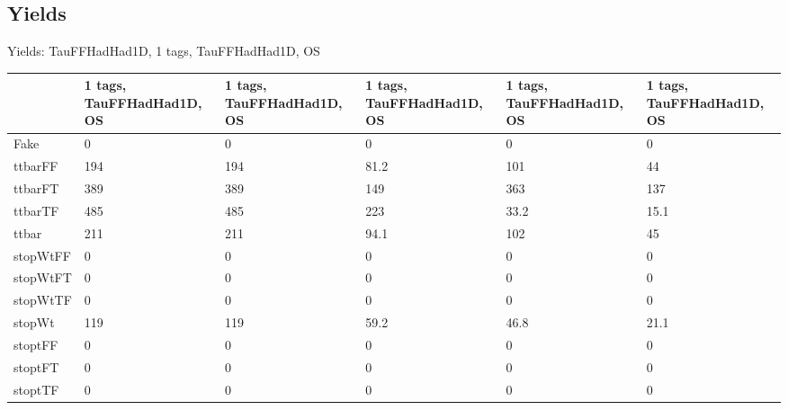 
\subsection{Yields}

\begin{frame}{Yields: TauFFHadHad1D, 1 tags, TauFFHadHad1D, OS}
\begin{center}
  \begin{tabular}{l| >{\centering\let\newline\\\arraybackslash\hspace{0pt}}m{1.4cm}| >{\centering\let\newline\\\arraybackslash\hspace{0pt}}m{1.4cm}| >{\centering\let\newline\\\arraybackslash\hspace{0pt}}m{1.4cm}| >{\centering\let\newline\\\arraybackslash\hspace{0pt}}m{1.4cm}| >{\centering\let\newline\\\arraybackslash\hspace{0pt}}m{1.4cm}}
    & 1 tags, TauFFHadHad1D, OS & 1 tags, TauFFHadHad1D, OS & 1 tags, TauFFHadHad1D, OS & 1 tags, TauFFHadHad1D, OS & 1 tags, TauFFHadHad1D, OS \\
 \hline \hline
    Fake& 0 & 0 & 0 & 0 & 0 \\
 \hline
    ttbarFF& 194 & 194 & 81.2 & 101 & 44 \\
 \hline
    ttbarFT& 389 & 389 & 149 & 363 & 137 \\
 \hline
    ttbarTF& 485 & 485 & 223 & 33.2 & 15.1 \\
 \hline
    ttbar& 211 & 211 & 94.1 & 102 & 45 \\
 \hline
    stopWtFF& 0 & 0 & 0 & 0 & 0 \\
 \hline
    stopWtFT& 0 & 0 & 0 & 0 & 0 \\
 \hline
    stopWtTF& 0 & 0 & 0 & 0 & 0 \\
 \hline
    stopWt& 119 & 119 & 59.2 & 46.8 & 21.1 \\
 \hline
    stoptFF& 0 & 0 & 0 & 0 & 0 \\
 \hline
    stoptFT& 0 & 0 & 0 & 0 & 0 \\
 \hline
    stoptTF& 0 & 0 & 0 & 0 & 0 \\
 \hline

\end{tabular}
\end{center}
\end{frame}

